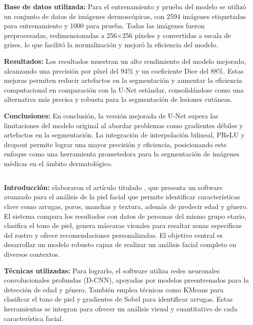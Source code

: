 \textbf{Base de datos utilizada:}
Para el entrenamiento y prueba del modelo se utilizó un conjunto de datos de imágenes dermoscópicas, con 2594 imágenes etiquetadas para entrenamiento y 1000 para prueba. Todas las imágenes fueron preprocesadas, redimensionadas a 256×256 píxeles y convertidas a escala de grises, lo que facilitó la normalización y mejoró la eficiencia del modelo.

\textbf{Resultados:}
Los resultados muestran un alto rendimiento del modelo mejorado, alcanzando una precisión por píxel del 94\% y un coeficiente Dice del 88\%. Estas mejoras permiten reducir artefactos en la segmentación y aumentar la eficiencia computacional en comparación con la U-Net estándar, consolidándose como una alternativa más precisa y robusta para la segmentación de lesiones cutáneas.

\textbf{Conclusiones:}
En conclusión, la versión mejorada de U-Net supera las limitaciones del modelo original al abordar problemas como gradientes débiles y artefactos en la segmentación. La integración de interpolación bilineal, PReLU y dropout permite lograr una mayor precisión y eficiencia, posicionando este enfoque como una herramienta prometedora para la segmentación de imágenes médicas en el ámbito dermatológico.

\subsection{}

\textbf{Introducción:}
\cite{Tamilkodi2024} elaboraron el artículo titulado , que presenta un software avanzado para el análisis de la piel facial que permite identificar características clave como arrugas, poros, manchas y textura, además de predecir edad y género. El sistema compara los resultados con datos de personas del mismo grupo etario, clasifica el tono de piel, genera máscaras visuales para resaltar zonas específicas del rostro y ofrece recomendaciones personalizadas. El objetivo central es desarrollar un modelo robusto capaz de realizar un análisis facial completo en diversos contextos.  

\textbf{Técnicas utilizadas:}
Para lograrlo, el software utiliza redes neuronales convolucionales profundas (D-CNN), apoyadas por modelos preentrenados para la detección de edad y género. También emplea técnicas como KMeans para clasificar el tono de piel y gradientes de Sobel para identificar arrugas. Estas herramientas se integran para ofrecer un análisis visual y cuantitativo de cada característica facial.  

